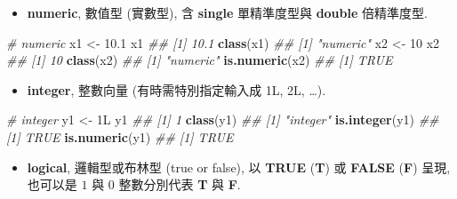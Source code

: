 \documentclass[
]{book}
\newenvironment{Shaded}{\begin{snugshade}}{\end{snugshade}}
\newcommand{\CommentTok}[1]{\textcolor[rgb]{0.56,0.35,0.01}{\textit{#1}}}
\newcommand{\DecValTok}[1]{\textcolor[rgb]{0.00,0.00,0.81}{#1}}
\newcommand{\FloatTok}[1]{\textcolor[rgb]{0.00,0.00,0.81}{#1}}
\newcommand{\KeywordTok}[1]{\textcolor[rgb]{0.13,0.29,0.53}{\textbf{#1}}}
\newcommand{\NormalTok}[1]{#1}
\newcommand{\StringTok}[1]{\textcolor[rgb]{0.31,0.60,0.02}{#1}}
\providecommand{\tightlist}{%
  \setlength{\itemsep}{0pt}\setlength{\parskip}{0pt}}
\begin{document}
\begin{itemize}
\tightlist
\item
  \textbf{numeric}, 數值型 (實數型), 含 \textbf{single} 單精準度型與 \textbf{double} 倍精準度型.
\end{itemize}

\begin{Shaded}
\begin{Highlighting}[]
\CommentTok{\# numeric}
\NormalTok{x1 \textless{}{-}}\StringTok{ }\FloatTok{10.1} 
\NormalTok{x1}
\CommentTok{\#\# [1] 10.1}
\KeywordTok{class}\NormalTok{(x1)}
\CommentTok{\#\# [1] "numeric"}
\NormalTok{x2 \textless{}{-}}\StringTok{ }\DecValTok{10}
\NormalTok{x2}
\CommentTok{\#\# [1] 10}
\KeywordTok{class}\NormalTok{(x2)}
\CommentTok{\#\# [1] "numeric"}
\KeywordTok{is.numeric}\NormalTok{(x2)}
\CommentTok{\#\# [1] TRUE}
\end{Highlighting}
\end{Shaded}

\begin{itemize}
\tightlist
\item
  \textbf{integer}, 整數向量 (有時需特別指定輸入成 1L, 2L, \ldots).
\end{itemize}

\begin{Shaded}
\begin{Highlighting}[]
\CommentTok{\# integer}
\NormalTok{y1 \textless{}{-}}\StringTok{ }\NormalTok{1L}
\NormalTok{y1}
\CommentTok{\#\# [1] 1}
\KeywordTok{class}\NormalTok{(y1)}
\CommentTok{\#\# [1] "integer"}
\KeywordTok{is.integer}\NormalTok{(y1)}
\CommentTok{\#\# [1] TRUE}
\KeywordTok{is.numeric}\NormalTok{(y1)}
\CommentTok{\#\# [1] TRUE}
\end{Highlighting}
\end{Shaded}

\begin{itemize}
\tightlist
\item
  \textbf{logical}, 邏輯型或布林型 (true or false), 以 \textbf{TRUE} (\textbf{T}) 或 \textbf{FALSE} (\textbf{F})
  呈現, 也可以是 \(1\) 與 \(0\) 整數分別代表 \textbf{T} 與 \textbf{F}.
\end{itemize}
\end{document}
